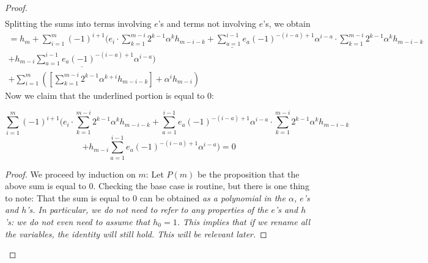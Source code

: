 \documentclass[10pt,a4paper]{amsart}
\begin{document}
\begin{proof}
\begin{gather*}
\end{gather*}
Splitting the sums into terms involving $e$'s and terms not involving $e$'s, we obtain
\begin{gather*}
= h_m+ \underline{\sum_{i=1}^m(-1)^{i+1}\Bigg(e_i \cdot \sum_{k=1}^{m-i}2^{k-1}\alpha^kh_{m-i-k} + \sum_{a=1}^{i-1}e_a (-1)^{-(i-a)+1}\alpha^{i-a}\cdot \sum_{k=1}^{m-i}2^{k-1}\alpha^kh_{m-i-k}} \\
\underline{+h_{m-i}\sum_{a=1}^{i-1}e_a(-1)^{-(i-a)+1}\alpha^{i-a}\Bigg)}\\
+\sum_{i=1}^m\left(\left[\sum_{k=1}^{m-i}2^{k-1}\alpha^{k+i}h_{m-i-k}\right]+\alpha^ih_{m-i}\right)
\end{gather*}
Now we claim that the underlined portion is equal to 0:

\begin{lemma}\label{sum=0}
$$
\sum_{i=1}^m(-1)^{i+1}\Bigg(e_i \cdot \sum_{k=1}^{m-i}2^{k-1}\alpha^kh_{m-i-k} + \sum_{a=1}^{i-1}e_a (-1)^{-(i-a)+1}\alpha^{i-a}\cdot \sum_{k=1}^{m-i}2^{k-1}\alpha^kh_{m-i-k}
$$
$$
+h_{m-i}\sum_{a=1}^{i-1}e_a(-1)^{-(i-a)+1}\alpha^{i-a}\Bigg)=0
$$
\end{lemma}

\begin{proof}
We proceed by induction on $m$: Let $P(m)$ be the proposition that the above sum is equal to 0. Checking the base case is routine, but there is one thing to note: That the sum is equal to 0 can be obtained \textit{as a polynomial in the $\alpha$, $e$'s and $h$'s. In particular, we do not need to refer to any properties of the $e$'s and $h$'s: we do not even need to assume that $h_0=1$. This implies that if we rename all the variables, the identity will still hold. This will be relevant later.}


\end{proof}
\end{proof}
\end{document}
